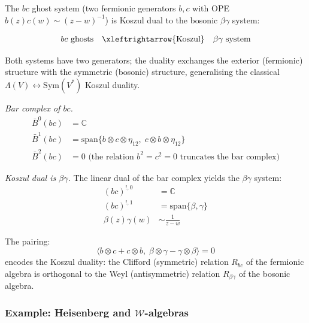 \begin{example}
The $bc$ ghost system (two fermionic generators $b, c$ with OPE $b(z)c(w) \sim (z-w)^{-1}$) is Koszul dual to the bosonic $\beta\gamma$ system:

\[bc \text{ ghosts} \quad \xleftrightarrow{\text{Koszul}} \quad \beta\gamma \text{ system}\]

Both systems have two generators; the duality exchanges the exterior (fermionic) structure with the symmetric (bosonic) structure, generalising the classical $\Lambda(V) \leftrightarrow \mathrm{Sym}(V^*)$ Koszul duality.

\emph{Bar complex of $bc$.}
\begin{align}
\bar{B}^0(bc) &= \mathbb{C} \\
\bar{B}^1(bc) &= \text{span}\{b \otimes c \otimes \eta_{12},\; c \otimes b \otimes \eta_{12}\} \\
\bar{B}^2(bc) &= 0 \text{ (the relation $b^2 = c^2 = 0$ truncates the bar complex)}
\end{align}

\emph{Koszul dual is $\beta\gamma$.}
The linear dual of the bar complex yields the $\beta\gamma$ system:
\begin{align}
(bc)^{!,0} &= \mathbb{C} \\
(bc)^{!,1} &= \text{span}\{\beta, \gamma\} \\
\beta(z)\gamma(w) &\sim \frac{1}{z-w}
\end{align}

The pairing:
\[\langle b \otimes c + c \otimes b,\; \beta \otimes \gamma - \gamma \otimes \beta \rangle = 0\]
encodes the Koszul duality: the Clifford (symmetric) relation $R_{bc}$ of the fermionic algebra is orthogonal to the Weyl (antisymmetric) relation $R_{\beta\gamma}$ of the bosonic algebra.
\end{example}

\subsubsection{Example: Heisenberg and $\mathcal{W}$-algebras}


